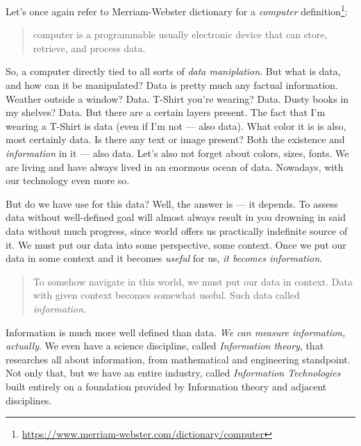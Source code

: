 \documentclass[../../what-is-computer.tex]{subfiles}
\begin{document}
    Let's once again refer to Merriam-Webster dictionary for a \emph{computer} definition\footnote{\href{https://www.merriam-webster.com/dictionary/computer}{https://www.merriam-webster.com/dictionary/computer}}:

    \begin{quote}
        computer is a programmable usually electronic device that can store, retrieve, and process data.
    \end{quote}

    So, a computer directly tied to all sorts of \emph{data maniplation}. But what is data, and how can it be manipulated? Data is pretty much any factual information.
    Weather outside a window? Data. T-Shirt you're wearing? Data. Dusty books in my shelves? Data. But there are a certain layers present. The fact that I'm wearing a T-Shirt 
    is data (even if I'm not --- also data). What color it is is also, most certainly data. Is there any text or image present?
    Both the existence and \emph{information} in it --- also data. Let's also not forget about colors, sizes, fonts. We are living and have always lived in an enormous ocean of data. Nowadays, with our technology even more so. \par

    But do we have use for this data? Well, the answer is --- it depends. To assess data without well-defined goal will almost always result in you drowning in said data without much progress,
    since world offers us practically indefinite source of it. We must put our data into some perspective, some context. Once we put our data in some context and it becomes \emph{useful} for us, \emph{it becomes information}.

    \begin{quote}
        To somehow navigate in this world, we must put our data in context. Data with given context becomes somewhat useful. Such data called \emph{information}.
    \end{quote}

    Information is much more well defined than data. \emph{We can measure information, actually}. We even have a science discipline, called \emph{Information theory},
    that researches all about information, from mathematical and engineering standpoint. Not only that, but we have an entire industry, called \emph{Information Technologies}
    built entirely on a foundation provided by Information theory and adjacent disciplines.\par
\end{document}
